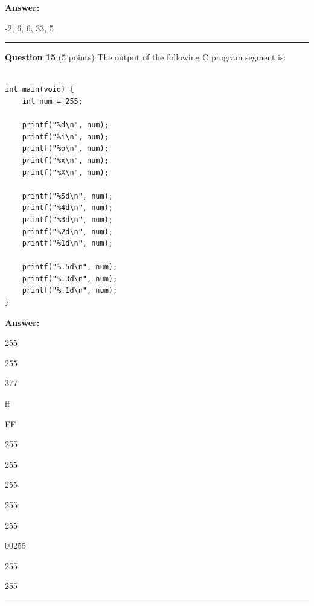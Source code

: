\documentclass{exam}
\begin{document}
\textbf{Answer:}

-2, 6, 6, 33, 5

\newpage




\begin{center}\noindent\rule{6in}{0.4pt}\end{center}

\textbf{Question 15} (5 points) The output of the following C program segment is:

\begin{lstlisting}

int main(void) {
	int num = 255;
	
	printf("%d\n", num);
	printf("%i\n", num);
	printf("%o\n", num);
	printf("%x\n", num);
	printf("%X\n", num);
	
	printf("%5d\n", num);
	printf("%4d\n", num);
	printf("%3d\n", num);
	printf("%2d\n", num);
	printf("%1d\n", num);
	
	printf("%.5d\n", num);
	printf("%.3d\n", num);
	printf("%.1d\n", num);
}

\end{lstlisting}

\textbf{Answer:}

255

255

377

ff

FF

\hspace{10px}255
  
\hspace{5px}255
 
255

255

255

00255

255

255


\newpage




\begin{center}\noindent\rule{6in}{0.4pt}\end{center}
\end{document}
